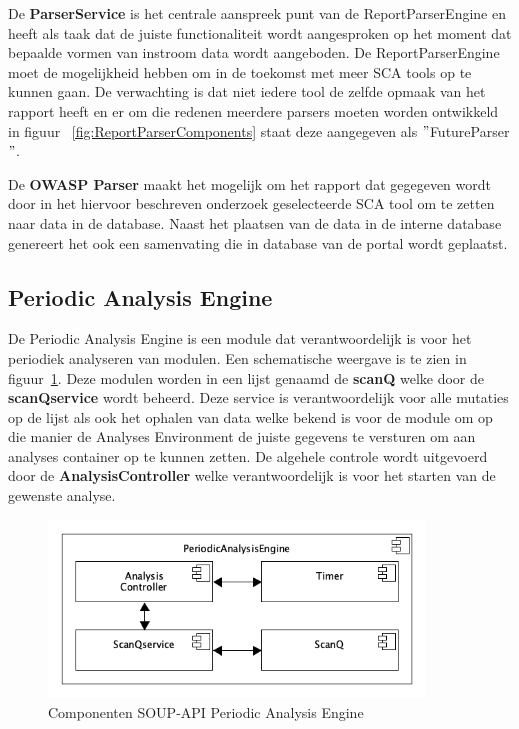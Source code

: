 De \textbf{ParserService} is het centrale aanspreek punt van de ReportParserEngine en heeft als taak dat de juiste functionaliteit wordt aangesproken op het moment dat bepaalde vormen van instroom data wordt aangeboden. De ReportParserEngine moet de mogelijkheid hebben om in de toekomst met meer SCA tools op te kunnen gaan. De verwachting is dat niet iedere tool de zelfde opmaak van het rapport heeft en er om die redenen meerdere parsers moeten worden ontwikkeld in figuur ~\ref{fig:ReportParserComponents} staat deze aangegeven als $"$FutureParser$"$.

De \textbf{OWASP Parser} maakt het mogelijk om het rapport dat gegegeven wordt door in het hiervoor beschreven onderzoek geselecteerde SCA tool om te zetten naar data in de database. Naast het plaatsen van de data in de interne database genereert het ook een samenvating die in database van de portal wordt geplaatst.

\subsection{Periodic Analysis Engine}\label{subsec:periodicanalysisengine}
De Periodic Analysis Engine is een module dat verantwoordelijk is voor het periodiek analyseren van modulen. Een schematische weergave is te zien in figuur~\ref{fig:SOUPAPIPeriodicAnalysisEngineComps}. Deze modulen worden in een lijst genaamd de \textbf{scanQ} welke door de \textbf{scanQservice} wordt beheerd. Deze service is verantwoordelijk voor alle mutaties op de lijst als ook het ophalen van data welke bekend is voor de module om op die manier de Analyses Environment de juiste gegevens te versturen om aan analyses container op te kunnen zetten. De algehele controle wordt uitgevoerd door de \textbf{AnalysisController} welke verantwoordelijk is voor het starten van de gewenste analyse.

\begin{figure}[bth]
    \myfloatalign
    \includegraphics[width=10cm]{gfx/umlet/exports/PeriodicAnalyisEngineComponents}
    \caption{Componenten SOUP-API Periodic Analysis Engine}
    \label{fig:SOUPAPIPeriodicAnalysisEngineComps}
\end{figure}

